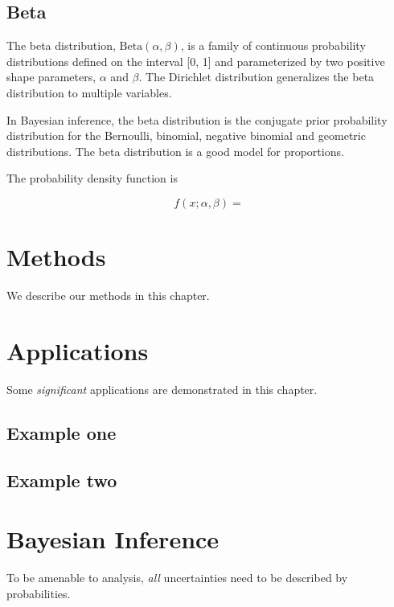 \documentclass[
]{book}
\begin{document}
\hypertarget{beta}{%
\section{Beta}\label{beta}}

The beta distribution, \(\mathrm{Beta}(\alpha, \beta)\), is a family of continuous probability distributions defined on the interval {[}0, 1{]} and parameterized by two positive shape parameters, \(\alpha\) and \(\beta\). The Dirichlet distribution generalizes the beta distribution to multiple variables.

In Bayesian inference, the beta distribution is the conjugate prior probability distribution for the Bernoulli, binomial, negative binomial and geometric distributions. The beta distribution is a good model for proportions.

The probability density function is

\[f(x; \alpha, \beta) = \]

\hypertarget{methods}{%
\chapter{Methods}\label{methods}}

We describe our methods in this chapter.

\hypertarget{applications}{%
\chapter{Applications}\label{applications}}

Some \emph{significant} applications are demonstrated in this chapter.

\hypertarget{example-one}{%
\section{Example one}\label{example-one}}

\hypertarget{example-two}{%
\section{Example two}\label{example-two}}

\hypertarget{bayesian-inference}{%
\chapter{Bayesian Inference}\label{bayesian-inference}}

To be amenable to analysis, \emph{all} uncertainties need to be described by probabilities.
\end{document}
